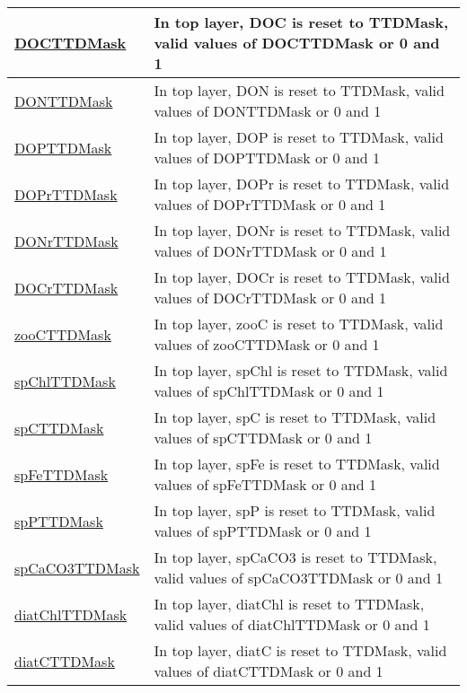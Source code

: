 {\begin{center}
\begin{longtable}{| p{2.0in} | p{4.0in} |}
    \hline
    \hyperref[subsec:var_sec_forcing_DOCTTDMask]{DOCTTDMask} & In top layer, DOC is reset to TTDMask, valid values of DOCTTDMask or 0 and 1 \\
    \hline
    \hyperref[subsec:var_sec_forcing_DONTTDMask]{DONTTDMask} & In top layer, DON is reset to TTDMask, valid values of DONTTDMask or 0 and 1 \\
    \hline
    \hyperref[subsec:var_sec_forcing_DOPTTDMask]{DOPTTDMask} & In top layer, DOP is reset to TTDMask, valid values of DOPTTDMask or 0 and 1 \\
    \hline
    \hyperref[subsec:var_sec_forcing_DOPrTTDMask]{DOPrTTDMask} & In top layer, DOPr is reset to TTDMask, valid values of DOPrTTDMask or 0 and 1 \\
    \hline
    \hyperref[subsec:var_sec_forcing_DONrTTDMask]{DONrTTDMask} & In top layer, DONr is reset to TTDMask, valid values of DONrTTDMask or 0 and 1 \\
    \hline
    \hyperref[subsec:var_sec_forcing_DOCrTTDMask]{DOCrTTDMask} & In top layer, DOCr is reset to TTDMask, valid values of DOCrTTDMask or 0 and 1 \\
    \hline
    \hyperref[subsec:var_sec_forcing_zooCTTDMask]{zooCTTDMask} & In top layer, zooC is reset to TTDMask, valid values of zooCTTDMask or 0 and 1 \\
    \hline
    \hyperref[subsec:var_sec_forcing_spChlTTDMask]{spChlTTDMask} & In top layer, spChl is reset to TTDMask, valid values of spChlTTDMask or 0 and 1 \\
    \hline
    \hyperref[subsec:var_sec_forcing_spCTTDMask]{spCTTDMask} & In top layer, spC is reset to TTDMask, valid values of spCTTDMask or 0 and 1 \\
    \hline
    \hyperref[subsec:var_sec_forcing_spFeTTDMask]{spFeTTDMask} & In top layer, spFe is reset to TTDMask, valid values of spFeTTDMask or 0 and 1 \\
    \hline
    \hyperref[subsec:var_sec_forcing_spPTTDMask]{spPTTDMask} & In top layer, spP is reset to TTDMask, valid values of spPTTDMask or 0 and 1 \\
    \hline
    \hyperref[subsec:var_sec_forcing_spCaCO3TTDMask]{spCaCO3TTDMask} & In top layer, spCaCO3 is reset to TTDMask, valid values of spCaCO3TTDMask or 0 and 1 \\
    \hline
    \hyperref[subsec:var_sec_forcing_diatChlTTDMask]{diatChlTTDMask} & In top layer, diatChl is reset to TTDMask, valid values of diatChlTTDMask or 0 and 1 \\
    \hline
    \hyperref[subsec:var_sec_forcing_diatCTTDMask]{diatCTTDMask} & In top layer, diatC is reset to TTDMask, valid values of diatCTTDMask or 0 and 1 \\

\end{longtable}
\end{center}}
